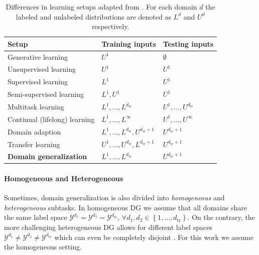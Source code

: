 \begin{table}[t]
    \centering
    \begin{tabular}{lll}
    \toprule
    \textbf{Setup} & \textbf{Training inputs}  & \textbf{Testing inputs} \\
    \midrule
        Generative learning & $U^1$ & $\emptyset$ \\ 
        Unsupervised learning & $U^1$ & $U^1$  \\ 
        Supervised learning & $L^1$ & $U^1$ \\ 
        Semi-supervised learning & $L^{1}, U^{1}$ & $U^1$ \\ 
        Multitask learning & $L^{1}, \ldots, L^{d_{\mathrm{tr}}}$ & $U^{1}, \ldots, U^{d_{\mathrm{tr}}}$ \\ 
        Continual (lifelong) learning & $L^{1}, \ldots, L^{\infty}$ & $U^{1}, \ldots, U^{\infty}$ \\ 
        Domain adaption & $L^{1}, \ldots, L^{d_{\mathrm{tr}}}, U^{d_{\mathrm{tr}}+1}$ & $U^{d_{\mathrm{tr}}+1}$ \\ 
        Transfer learning & $U^{1}, \ldots, U^{d_{\mathrm{tr}}}, L^{d_{\mathrm{tr}}+1}$ & $U^{d_{\mathrm{tr}}+1}$ \\ 
        \textbf{Domain generalization} & $L^{1}, \ldots, L^{d_{\mathrm{tr}}}$ & $U^{d_{\mathrm{tr}}+1}$ \\ 
    \bottomrule
    \end{tabular}
    \caption[Differences in learning setups]{Differences in learning setups adapted from \citet{gulrajani2020search}. For each domain $d$ the labeled and unlabeled distributions are denoted as $L^d$ and $U^d$ respectively.}
    \label{tab:learning_setups}
\end{table}

\paragraph{Homogeneous and Heterogeneous}
Sometimes, domain generalization is also divided into \emph{homogeneous} and \emph{heterogeneous} subtasks. In homogeneous DG we assume that all domains share the same label space $\mathcal{Y}^{d_1} = \mathcal{Y}^{d_2} = \mathcal{Y}^{d_\mathrm{te}}$, $\forall d_1, d_2 \in \left\{1, \ldots, d_{\mathrm{tr}}\right\}$. On the contrary, the more challenging heterogeneous DG allows for different label spaces $\mathcal{Y}^{d_1} \neq \mathcal{Y}^{d_2} \neq \mathcal{Y}^{d_\mathrm{te}}$ which can even be completely disjoint \citep{LiZYLSH19}. For this work we assume the homogeneous setting.

